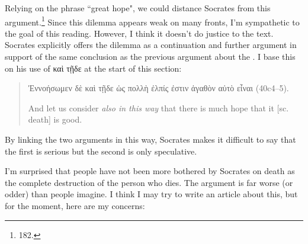 \documentclass[11pt]{article}
\begin{document}
Relying on the phrase ``great hope", we could distance Socrates from this argument.\footnote{\citet{reeve1989} 182.}  Since this dilemma appears weak on many fronts, I'm sympathetic to the goal of this reading.  However, I think it doesn't do justice to the text.  Socrates explicitly offers the dilemma as a continuation and further argument in support of the same conclusion as the previous argument about the .  I base this on his use of {\g καὶ τῇδε} at the start of this section:

\begin{quote}
    {\g Ἐννοήσωμεν δὲ καὶ τῇδε ὡς πολλὴ ἐλπίς ἐστιν ἀγαθὸν αὐτὸ εἶναι} (40c4--5).

    And let us consider \emph{also in this way} that there is much hope that it [sc. death] is good.
\end{quote}

By linking the two arguments in this way, Socrates makes it difficult to say that the first is serious but the second is only speculative.

I'm surprised that people have not been more bothered by Socrates on death as the complete destruction of the person who dies.  The argument is far worse (or odder) than people imagine.  I think I may try to write an article about this, but for the moment, here are my concerns:
\end{document}

